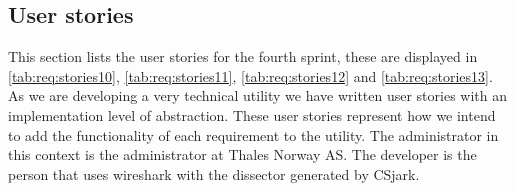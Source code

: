 \subsection{User stories}
\label{sec:req:stories4}
This section lists the user stories for the fourth sprint, these are displayed in \autoref{tab:req:stories10}, \autoref{tab:req:stories11}, \autoref{tab:req:stories12} and \autoref{tab:req:stories13}.
As we are developing a very technical \gls{utility} we have written user stories with an implementation level of abstraction. 
These user stories represent how we intend to add the functionality of each requirement to the \gls{utility}.
The administrator in this context is the administrator at Thales Norway AS. 
The developer is the person that uses \Gls{wireshark} with the \gls{dissector} generated by CSjark.

